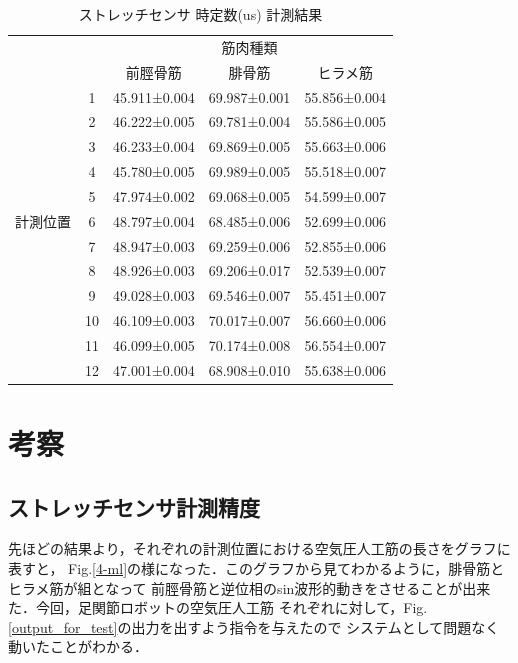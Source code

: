 \begin{table}[h]
    \caption{ストレッチセンサ 時定数(us) 計測結果}
    \label{4_2}
        \begin{center}
            \begin{tabular}{|c|c|ccc|}\hline
            \multicolumn{2}{|c|}{} & \multicolumn{3}{c|}{筋肉種類}\\
            \cline{3-5}
            \multicolumn{2}{|c|}{} & 前脛骨筋 & 腓骨筋 & ヒラメ筋 \\ \hline
            & 1 & 45.911±0.004 & 69.987±0.001 & 55.856±0.004 \\ \cline{2-5}
            & 2 & 46.222±0.005 & 69.781±0.004 & 55.586±0.005 \\ \cline{2-5}
            & 3 & 46.233±0.004 & 69.869±0.005 & 55.663±0.006 \\ \cline{2-5}
            & 4 & 45.780±0.005 & 69.989±0.005 & 55.518±0.007 \\ \cline{2-5}
            & 5 & 47.974±0.002 & 69.068±0.005 & 54.599±0.007 \\ \cline{2-5}
            計測位置 & 6 & 48.797±0.004 & 68.485±0.006 & 52.699±0.006 \\ \cline{2-5}
            & 7 & 48.947±0.003 & 69.259±0.006 & 52.855±0.006 \\ \cline{2-5}
            & 8 & 48.926±0.003 & 69.206±0.017 & 52.539±0.007 \\ \cline{2-5}
            & 9 & 49.028±0.003 & 69.546±0.007 & 55.451±0.007 \\ \cline{2-5}
            & 10 & 46.109±0.003 & 70.017±0.007 & 56.660±0.006 \\ \cline{2-5}
            & 11 & 46.099±0.005 & 70.174±0.008 & 56.554±0.007 \\ \cline{2-5}
            & 12 & 47.001±0.004 & 68.908±0.010 & 55.638±0.006 \\ \hline
        \end{tabular}
    \end{center}
\end{table}

\section{考察}
\subsection{ストレッチセンサ計測精度}
先ほどの結果より，それぞれの計測位置における空気圧人工筋の長さをグラフに表すと，
Fig.\ref{4-ml}の様になった．このグラフから見てわかるように，腓骨筋とヒラメ筋が組となって
前脛骨筋と逆位相のsin波形的動きをさせることが出来た．今回，足関節ロボットの空気圧人工筋
それぞれに対して，Fig.\ref{output_for_test}の出力を出すよう指令を与えたので
システムとして問題なく動いたことがわかる．


